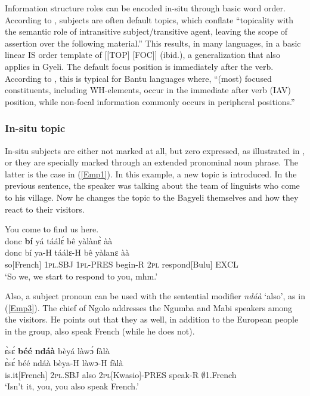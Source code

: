 Information structure roles can be encoded in-situ through basic word order. According to \citet[159]{guldemann2015}, subjects are often default topics, which conflate  ``topicality with the semantic role of intransitive subject/transitive agent, leaving the scope of assertion over the following material.'' This results, in many languages, in a basic linear IS order template of [[TOP] [FOC]] (ibid.), a generalization that also applies in Gyeli. The default focus position is immediately after the verb. According to \citet[793]{downing2014}, this is typical for Bantu languages where, ``(most) focused constituents, including WH-elements, occur in the immediate after verb (IAV) position, while non-focal information commonly occurs in peripheral positions.''


\subsubsection{In-situ topic}
\label{sec:insituTop}


In-situ subjects are either not marked at all, but zero expressed, as illustrated in , or they are specially marked through an extended pronominal noun phrase. The latter is the case in (\ref{Emp1}).
In this example, a new topic is introduced. In the previous sentence, the speaker was talking about the team of linguists who come to his village. Now he changes the topic to the Bagyeli themselves and how they react to their visitors.
\begin{exe} 
\ex\label{Emp1} You come to find us here.\\
 \glll  donc {\bfseries bí} yá táálɛ́ bê yàlànɛ̀ àà\\
       donc bí ya-H táálɛ-H bê yàlanɛ àà\\
       so[French] 1\textsc{pl}.SBJ  1\textsc{pl}-PRES begin-R 2\textsc{pl} respond[Bulu] EXCL\\
    \trans `So we, we start to respond to you, mhm.'
\end{exe}

Also, a subject pronoun can be used with the sentential modifier {\itshape ndáà} `also', as in (\ref{Emp3}). The chief of Ngolo addresses the Ngumba and Mabi speakers among the visitors. He points out that they as well, in addition to the European people in the group, also speak French (while he does not). 

\begin{exe} 
\ex\label{Emp3} 
  \glll  ɛ̀sɛ́ {\bfseries béé} {\bfseries ndáà} bèyá làwɔ́ fàlà\\
       ɛ̀sɛ́ béé ndáà bèya-H làwɔ-H fàlà\\
        is.it[French] 2\textsc{pl}.SBJ also 2\textsc{pl}[Kwasio]-PRES speak-R $\emptyset$1.French\\
    \trans `Isn't it, you, you also speak French.'
\end{exe}

